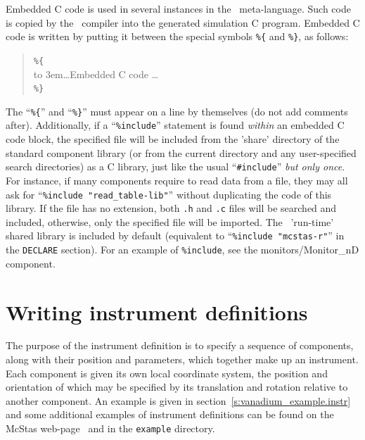 Embedded C code is used in several instances in the \MCS\
meta-language. Such code is copied by the \MCS\ compiler into the
generated simulation C program. Embedded C code is written by putting it
between the special symbols \verb|%{| and \verb|%}|, as follows:
\begin{quote}
  \verb|%{| \\
  \hbox to 3em{}\ldots Embedded C code \ldots \\
  \verb|%}|
\end{quote} 
The ``\verb|%{|'' and ``\verb|%}|'' must appear on a line by themselves (do not add comments after).
Additionally, if a ``\verb+%include+'' statement is found \emph{within} an embedded C code block, the specified file will be included from the 'share' directory of the standard component library  (or from the
current directory and any user-specified search directories) as a C library, just like the usual ``\verb+#include+'' \emph{but only once}. For instance, if many components require to read data from a file, they may all ask for ``\verb+%include "read_table-lib"+''  without duplicating the code of this library. If the file has no extension, both \verb+.h+ and \verb+.c+ files will be searched and included, otherwise, only the specified file will be imported. The \MCS\ 'run-time' shared
library is included by default (equivalent to ``\verb+%include "mcstas-r"+'' in the \texttt{DECLARE} section). \index{Library!Run-time}
For an
example of \texttt{\%include}, see the monitors/Monitor\_nD component.


\section{Writing instrument definitions}
\label{s:instrdefs}

The purpose of the instrument definition is to specify a sequence of
components, along with their position and parameters, which together
make up an instrument. Each component is given its own local coordinate
system, the position and orientation of which may be specified by its
translation and rotation relative to another component. An example is
given in section~\ref{s:vanadium_example.instr} and some additional
examples of instrument definitions can be found on the McStas
web-page~\cite{mcstas_webpage} and in the \texttt{example} directory.



